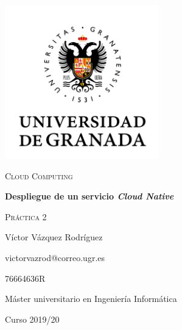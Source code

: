 \documentclass{article}
\begin{document}
\begin{titlepage}
    \centering
    \includegraphics[width=0.5\textwidth]{images/logo-ugr.png}\par
    \vspace{1cm}
    {\Large\scshape Cloud Computing \par}
    {\huge\bfseries Despliegue de un servicio \textit{Cloud Native} \par}
    \vspace{0.2cm}
    {\scshape Práctica 2 \par}
    \vfill
    {\large Víctor Vázquez Rodríguez  \par}
    {victorvazrod@correo.ugr.es \par}
    {76664636R \par}
    \vfill
    {\large Máster universitario en Ingeniería Informática \par}
    \vspace{0.2cm}
    {Curso 2019/20 \par}
\end{titlepage}

\tableofcontents\newpage

\newpage
\newpage
\newpage
\newpage
\newpage
\end{document}
